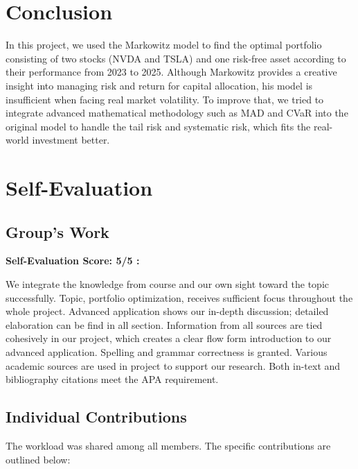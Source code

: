 \documentclass[12pt]{article}
\begin{document}
\section{Conclusion}
In this project, we used the Markowitz model to find the optimal portfolio consisting of two stocks (NVDA and TSLA) and one risk-free asset according to their performance from 2023 to 2025. Although Markowitz provides a creative insight into managing risk and return for capital allocation, his model is insufficient when facing real market volatility. To improve that, we tried to integrate advanced mathematical methodology such as MAD and CVaR into the original model to handle the tail risk and systematic risk, which fits the real-world investment better.

\section{Self-Evaluation}

\subsection{Group's Work}
\textbf{Self-Evaluation Score: 5/5 :}

We integrate the knowledge from course and our own sight toward the topic successfully. Topic, portfolio optimization, receives sufficient focus throughout the whole project. Advanced application shows our in-depth discussion; detailed elaboration can be find in all section. Information from all sources are tied cohesively in our project, which creates a clear flow form introduction to our advanced application. Spelling and grammar correctness is granted. Various academic sources are used in project to support our research. Both in-text and bibliography citations meet the APA requirement.


\subsection{Individual Contributions}
The workload was shared among all members. The specific contributions are outlined below:
\end{document}
